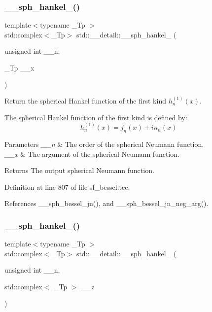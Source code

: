 \subsubsection{\texorpdfstring{\+\_\+\+\_\+sph\+\_\+hankel\+\_()}{\_\_sph\_hankel\_1()}\hspace{0.1cm}{\footnotesize\ttfamily [1/2]}}
{\footnotesize\ttfamily template$<$typename \+\_\+\+Tp $>$ \\
std\+::complex$<$\+\_\+\+Tp$>$ std\+::\+\_\+\+\_\+detail\+::\+\_\+\+\_\+sph\+\_\+hankel\+\_ (\begin{DoxyParamCaption}\item[{unsigned int}]{\+\_\+\+\_\+n,  }\item[{\+\_\+\+Tp}]{\+\_\+\+\_\+x }\end{DoxyParamCaption})}



Return the spherical Hankel function of the first kind $ h^{(1)}_n(x) $. 

The spherical Hankel function of the first kind is defined by\+: \[ h^{(1)}_n(x) = j_n(x) + i n_n(x) \]


\begin{DoxyParams}{Parameters}
{\em \+\_\+\+\_\+n} & The order of the spherical Neumann function. \\
\hline
{\em \+\_\+\+\_\+x} & The argument of the spherical Neumann function. \\
\hline
\end{DoxyParams}
\begin{DoxyReturn}{Returns}
The output spherical Neumann function. 
\end{DoxyReturn}


Definition at line 807 of file sf\+\_\+bessel.\+tcc.



References \+\_\+\+\_\+sph\+\_\+bessel\+\_\+jn(), and \+\_\+\+\_\+sph\+\_\+bessel\+\_\+jn\+\_\+neg\+\_\+arg().

\mbox{\label{namespacestd_1_1____detail_a887838c407a7cdb7c4ee145a18d2aa12}} 
\subsubsection{\texorpdfstring{\+\_\+\+\_\+sph\+\_\+hankel\+\_()}{\_\_sph\_hankel\_1()}\hspace{0.1cm}{\footnotesize\ttfamily [2/2]}}
{\footnotesize\ttfamily template$<$typename \+\_\+\+Tp $>$ \\
std\+::complex$<$\+\_\+\+Tp$>$ std\+::\+\_\+\+\_\+detail\+::\+\_\+\+\_\+sph\+\_\+hankel\+\_ (\begin{DoxyParamCaption}\item[{unsigned int}]{\+\_\+\+\_\+n,  }\item[{std\+::complex$<$ \+\_\+\+Tp $>$}]{\+\_\+\+\_\+z }\end{DoxyParamCaption})}



